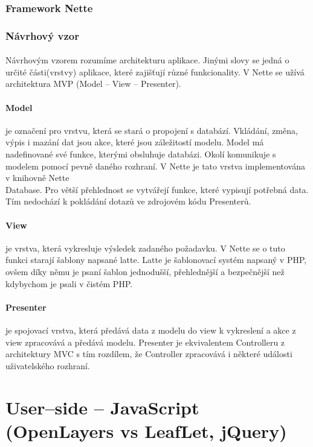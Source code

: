 \documentclass[11pt,a4paper,titlepage,oneside]{book}
\begin{document}
			\subsubsection{Framework Nette}
				\paragraph{}

			\subsubsection{Návrhový vzor}
				\paragraph{} Návrhovým vzorem rozumíme architekturu aplikace. Jinými slovy se jedná o určité části(vrstvy) aplikace, které zajišťují různé funkcionality. V Nette se užívá architektura MVP (Model -- View -- Presenter).
				\paragraph{Model} je označení pro vrstvu, která se stará o propojení s databází. Vkládání, změna, výpis i mazání dat jsou akce, které jsou záležitostí modelu. Model má nadefinované své funkce, kterými obsluhuje databázi. Okolí komunikuje s modelem pomocí pevně daného rozhraní. V Nette je tato vrstva implementována v knihovně Nette\\Database. Pro větší přehlednost se vytvářejí funkce, které vypisují potřebná data. Tím nedochází k pokládání dotazů ve zdrojovém kódu Presenterů.
				\paragraph{View} je vrstva, která vykresluje výsledek zadaného požadavku. V Nette se o tuto funkci starají šablony napsané latte. Latte je šablonovací systém napsaný v PHP, ovšem díky němu je psaní šablon jednodušší, přehlednější a bezpečnější než kdybychom je psali v čistém PHP.
				\paragraph{Presenter} je spojovací vrstva, která předává data z modelu do view k vykreslení a akce z view zpracovává a předává modelu. Presenter je ekvivalentem Controlleru z architektury MVC s tím rozdílem, že Controller zpracovává i některé události uživatelského rozhraní.
	\section{User--side -- JavaScript (OpenLayers vs LeafLet, jQuery)}
\end{document}
